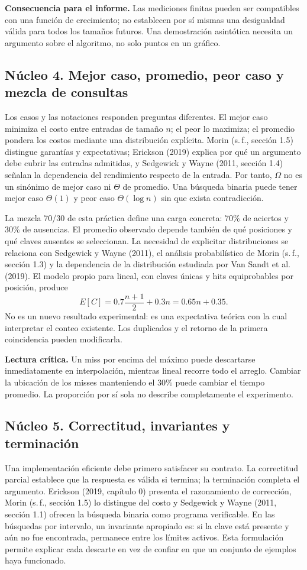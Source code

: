 \textbf{Consecuencia para el informe.} Las mediciones finitas pueden ser compatibles con una función de crecimiento; no establecen por sí mismas una desigualdad válida para todos los tamaños futuros. Una demostración asintótica necesita un argumento sobre el algoritmo, no solo puntos en un gráfico.

\subsection{Núcleo 4. Mejor caso, promedio, peor caso y mezcla de consultas}
Los casos y las notaciones responden preguntas diferentes. El mejor caso minimiza el costo entre entradas de tamaño $n$; el peor lo maximiza; el promedio pondera los costos mediante una distribución explícita. Morin (s.\,f., sección 1.5) distingue garantías y expectativas; Erickson (2019) explica por qué un argumento debe cubrir las entradas admitidas, y Sedgewick y Wayne (2011, sección 1.4) señalan la dependencia del rendimiento respecto de la entrada. Por tanto, $\Omega$ no es un sinónimo de mejor caso ni $\Theta$ de promedio. Una búsqueda binaria puede tener mejor caso $\Theta(1)$ y peor caso $\Theta(\log n)$ sin que exista contradicción.

La mezcla 70/30 de esta práctica define una carga concreta: 70\% de aciertos y 30\% de ausencias. El promedio observado depende también de qué posiciones y qué claves ausentes se seleccionan. La necesidad de explicitar distribuciones se relaciona con Sedgewick y Wayne (2011), el análisis probabilístico de Morin (s.\,f., sección 1.3) y la dependencia de la distribución estudiada por Van Sandt et al. (2019). El modelo propio para lineal, con claves únicas y hits equiprobables por posición, produce
\[
E[C]=0.7\frac{n+1}{2}+0.3n=0.65n+0.35.
\]
No es un nuevo resultado experimental: es una expectativa teórica con la cual interpretar el conteo existente. Los duplicados y el retorno de la primera coincidencia pueden modificarla.

\textbf{Lectura crítica.} Un miss por encima del máximo puede descartarse inmediatamente en interpolación, mientras lineal recorre todo el arreglo. Cambiar la ubicación de los misses manteniendo el 30\% puede cambiar el tiempo promedio. La proporción por sí sola no describe completamente el experimento.

\subsection{Núcleo 5. Correctitud, invariantes y terminación}
Una implementación eficiente debe primero satisfacer su contrato. La correctitud parcial establece que la respuesta es válida si termina; la terminación completa el argumento. Erickson (2019, capítulo 0) presenta el razonamiento de corrección, Morin (s.\,f., sección 1.5) lo distingue del costo y Sedgewick y Wayne (2011, sección 1.1) ofrecen la búsqueda binaria como programa verificable. En las búsquedas por intervalo, un invariante apropiado es: si la clave está presente y aún no fue encontrada, permanece entre los límites activos. Esta formulación permite explicar cada descarte en vez de confiar en que un conjunto de ejemplos haya funcionado.

